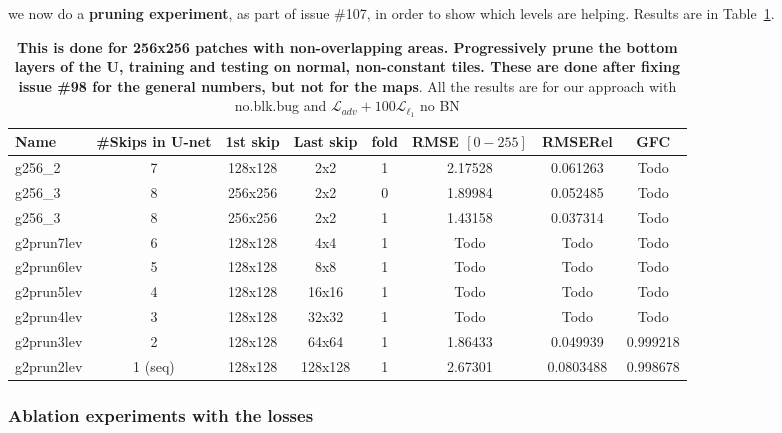 \documentclass{bmvc2k}
\begin{document}
we now do a \textbf{pruning experiment}, as part of issue \#107, in order to show which levels are helping. Results are in Table~\ref{tab:results_pruning}.
\begin{table}%
	\begin{center}
		\begin{tabular}{|lcccc|ccc|}
			\hline
			Name & \#Skips in U-net & 1st skip & Last skip & fold & RMSE $[0-255]$ & RMSERel & GFC \\
			\hline\hline
            g256\_2 & 7 & 128x128 & 2x2 & 1 & 2.17528 & 0.061263 & Todo\\
			\hline
            g256\_3 & 8 & 256x256 & 2x2 & 0 & 1.89984 & 0.052485 & Todo\\
			\hline
			g256\_3 & 8 & 256x256 & 2x2 & 1 & 1.43158 & 0.037314 & Todo\\
			\hline
            g2prun7lev & 6 & 128x128 & 4x4 & 1 & Todo & Todo & Todo\\
			\hline           
            g2prun6lev & 5 & 128x128 & 8x8 & 1 & Todo & Todo & Todo\\
			\hline
            g2prun5lev & 4 & 128x128 & 16x16 & 1 & Todo & Todo & Todo\\
			\hline           
            g2prun4lev & 3 & 128x128 & 32x32 & 1 & Todo & Todo & Todo\\
            \hline            
            g2prun3lev &2 & 128x128 & 64x64 & 1 &  1.86433 & 0.049939 & 0.999218\\
            \hline            
            g2prun2lev & 1 (seq) & 128x128 & 128x128 & 1 & 2.67301 & 0.0803488 & 0.998678\\
			\hline
		\end{tabular}
	\end{center}
	\caption{\textbf{This is done for 256x256 patches with non-overlapping areas. Progressively prune the bottom layers of the U, training and testing on normal, non-constant tiles. These are done after fixing issue \#98 for the general numbers, but not for the maps}. All the results are for our approach with no.blk.bug and $\mathcal{L}_{adv} + 100\mathcal{L}_{\ell_1}$ no BN }
    \label{tab:results_pruning}
\end{table}

\subsubsection{Ablation experiments with the losses}
\end{document}
